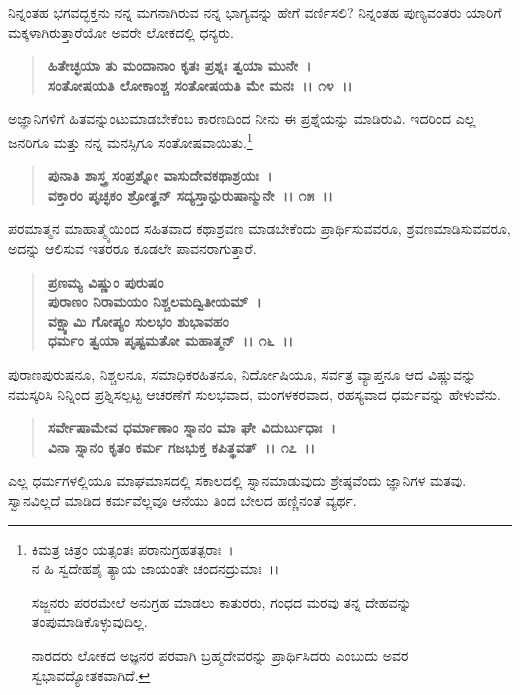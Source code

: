ನಿನ್ನಂತಹ ಭಗವದ್ಭಕ್ತನು ನನ್ನ ಮಗನಾಗಿರುವ ನನ್ನ ಭಾಗ್ಯವನ್ನು ಹೇಗೆ ವರ್ಣಿಸಲಿ? ನಿನ್ನಂತಹ ಪುಣ್ಯವಂತರು ಯಾರಿಗೆ ಮಕ್ಕಳಾಗಿರುತ್ತಾರೆಯೋ ಅವರೇ ಲೋಕದಲ್ಲಿ ಧನ್ಯರು.

\begin{verse}
\textbf{ಹಿತೇಚ್ಛಯಾ ತು ಮಂದಾನಾಂ ಕೃತಃ ಪ್ರಶ್ನಃ ತ್ವಯಾ ಮುನೇ~।}\\\textbf{ಸಂತೋಷಯತಿ ಲೋಕಾಂಶ್ಚ ಸಂತೋಷಯತಿ ಮೇ ಮನಃ~।। ೧೪~।।}
\end{verse}

ಅಜ್ಞಾನಿಗಳಿಗೆ ಹಿತವನ್ನುಂಟುಮಾಡಬೇಕೆಂಬ ಕಾರಣದಿಂದ ನೀನು ಈ ಪ್ರಶ್ನೆಯನ್ನು ಮಾಡಿರುವಿ. ಇದರಿಂದ ಎಲ್ಲ ಜನರಿಗೂ ಮತ್ತು ನನ್ನ ಮನಸ್ಸಿಗೂ ಸಂತೋಷವಾಯಿತು.\footnote{\phantom{*} ಕಿಮತ್ರ ಚಿತ್ರಂ ಯತ್ಸಂತಃ ಪರಾನುಗ್ರಹತತ್ಪರಾಃ~।\\ ನ ಹಿ ಸ್ವದೇಹಶೈ ತ್ಯಾಯ ಜಾಯಂತೇ ಚಂದನದ್ರುಮಾಃ~।।

ಸಜ್ಜನರು ಪರರಮೇಲೆ ಅನುಗ್ರಹ ಮಾಡಲು ಕಾತುರರು, ಗಂಧದ ಮರವು ತನ್ನ ದೇಹವನ್ನು ತಂಪುಮಾಡಿಕೊಳ್ಳುವು\-ದಿಲ್ಲ.

ನಾರದರು ಲೋಕದ ಅಜ್ಞನರ ಪರವಾಗಿ ಬ್ರಹ್ಮದೇವರನ್ನು ಪ್ರಾರ್ಥಿಸಿದರು ಎಂಬುದು ಅವರ ಸ್ವಭಾವದ್ಯೋತಕ\-ವಾಗಿದೆ.}

\begin{verse}
\textbf{ಪುನಾತಿ ಶಾಸ್ತ್ರ ಸಂಪ್ರಶ್ನೋ ವಾಸುದೇವಕಥಾಶ್ರಯಃ~।}\\\textbf{ವಕ್ತಾರಂ ಪೃಚ್ಛಕಂ ಶ್ರೋತೄನ್ ಸದ್ಯಸ್ತಾನ್ಪುರುಷಾನ್ಮುನೇ~।। ೧೫~।।}
\end{verse}

ಪರಮಾತ್ಮನ ಮಾಹಾತ್ಮ್ಯೆಯಿಂದ ಸಹಿತವಾದ ಕಥಾಶ್ರವಣ ಮಾಡಬೇಕೆಂದು ಪ್ರಾರ್ಥಿಸು\-ವವರೂ, ಶ್ರವಣಮಾಡಿಸುವವರೂ, ಅದನ್ನು ಆಲಿಸುವ ಇತರರೂ ಕೂಡಲೇ ಪಾವನ\-ರಾಗುತ್ತಾರೆ.

\begin{verse}
\textbf{ಪ್ರಣಮ್ಯ ವಿಷ್ಣುಂ ಪುರುಷಂ} \\\textbf{ಪುರಾಣಂ ನಿರಾಮಯಂ ನಿಶ್ಚಲಮದ್ವಿತೀಯಮ್~।}\\\textbf{ವಕ್ಷ್ಯಾಮಿ ಗೋಪ್ಯಂ ಸುಲಭಂ ಶುಭಾವಹಂ}\\\textbf{ಧರ್ಮಂ ತ್ವಯಾ ಪೃಷ್ಟಮತೋ ಮಹಾತ್ಮನ್~।। ೧೬~।।}
\end{verse}

ಪುರಾಣಪುರುಷನೂ, ನಿಶ್ಚಲನೂ, ಸಮಾಧಿಕರಹಿತನೂ, ನಿರ್ದೋಷಿಯೂ, ಸರ್ವತ್ರ ವ್ಯಾಪ್ತನೂ ಆದ ವಿಷ್ಣುವನ್ನು ನಮಸ್ಕರಿಸಿ ನಿನ್ನಿಂದ ಪ್ರಶ್ನಿಸಲ್ಪಟ್ಟ ಆಚರಣೆಗೆ ಸುಲಭವಾದ, ಮಂಗಳಕರವಾದ, ರಹಸ್ಯವಾದ ಧರ್ಮವನ್ನು ಹೇಳುವೆನು.

\begin{verse}
\textbf{ಸರ್ವೇಷಾಮೇವ ಧರ್ಮಾಣಾಂ ಸ್ನಾನಂ ಮಾ ಘೇ ವಿದುರ್ಬುಧಾಃ~।}\\\textbf{ವಿನಾ ಸ್ನಾನಂ ಕೃತಂ ಕರ್ಮ ಗಜಭುಕ್ತ ಕಪಿತ್ಥವತ್~।। ೧೭~।।}
\end{verse}

ಎಲ್ಲ ಧರ್ಮಗಳಲ್ಲಿಯೂ ಮಾಘಮಾಸದಲ್ಲಿ ಸಕಾಲದಲ್ಲಿ ಸ್ನಾನಮಾಡುವುದು ಶ್ರೇಷ್ಠವೆಂದು ಜ್ಞಾನಿಗಳ ಮತವು. ಸ್ವಾನವಿಲ್ಲದೆ ಮಾಡಿದ ಕರ್ಮವೆಲ್ಲವೂ ಆನೆಯು ತಿಂದ ಬೇಲದ ಹಣ್ಣಿನಂತೆ ವ್ಯರ್ಥ.

